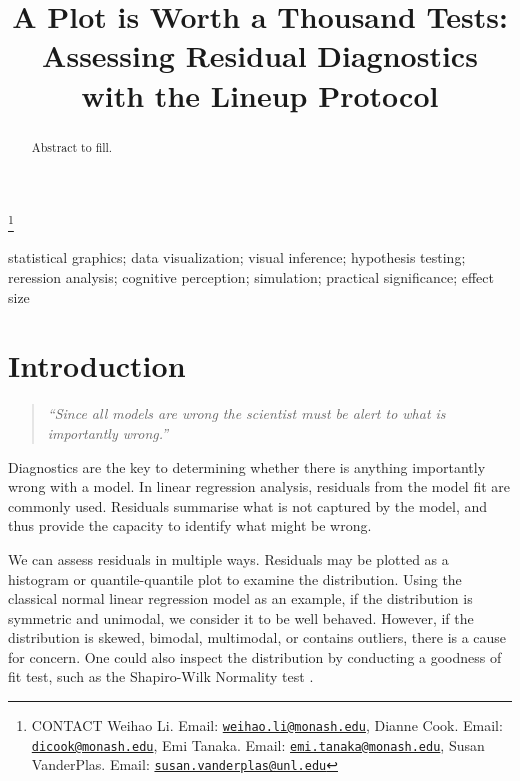 \documentclass[]{interact}
\theoremstyle{plain}%
\theoremstyle{definition}
\theoremstyle{remark}
\begin{document}

\title{A Plot is Worth a Thousand Tests: Assessing Residual Diagnostics
with the Lineup Protocol}


\author{
}

\thanks{CONTACT Weihao
Li. Email: \href{mailto:weihao.li@monash.edu}{\nolinkurl{weihao.li@monash.edu}}, Dianne
Cook. Email: \href{mailto:dicook@monash.edu}{\nolinkurl{dicook@monash.edu}}, Emi
Tanaka. Email: \href{mailto:emi.tanaka@monash.edu}{\nolinkurl{emi.tanaka@monash.edu}}, Susan
VanderPlas. Email: \href{mailto:susan.vanderplas@unl.edu}{\nolinkurl{susan.vanderplas@unl.edu}}}

\maketitle

\begin{abstract}
Abstract to fill.
\end{abstract}

\begin{keywords}
statistical graphics; data visualization; visual inference; hypothesis
testing; reression analysis; cognitive perception; simulation; practical
significance; effect size
\end{keywords}

\hypertarget{introduction}{%
\section{Introduction}\label{introduction}}

\begin{quote}
\emph{``Since all models are wrong the scientist must be alert to what
is importantly wrong.''} \citep{box1976science}
\end{quote}

Diagnostics are the key to determining whether there is anything
importantly wrong with a model. In linear regression analysis, residuals
from the model fit are commonly used. Residuals summarise what is not
captured by the model, and thus provide the capacity to identify what
might be wrong.

We can assess residuals in multiple ways. Residuals may be plotted as a
histogram or quantile-quantile plot to examine the distribution. Using
the classical normal linear regression model as an example, if the
distribution is symmetric and unimodal, we consider it to be well
behaved. However, if the distribution is skewed, bimodal, multimodal, or
contains outliers, there is a cause for concern. One could also inspect
the distribution by conducting a goodness of fit test, such as the
Shapiro-Wilk Normality test \citep{shapiro1965analysis}.
\end{document}
